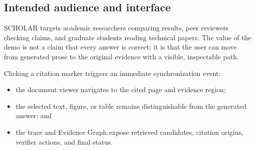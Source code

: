 \subsection{Intended audience and interface}
\textsc{SCHOLAR} targets academic researchers comparing results, peer reviewers checking claims, and graduate students reading technical papers. The value of the demo is not a claim that every answer is correct; it is that the user can move from generated prose to the original evidence with a visible, inspectable path.

Clicking a citation marker triggers an immediate synchronization event:
\begin{itemize}[leftmargin=*,itemsep=1pt,topsep=2pt]
    \item the document viewer navigates to the cited page and evidence region;
    \item the selected text, figure, or table remains distinguishable from the generated answer; and
    \item the trace and Evidence Graph expose retrieved candidates, citation origins, verifier actions, and final status.
\end{itemize}
